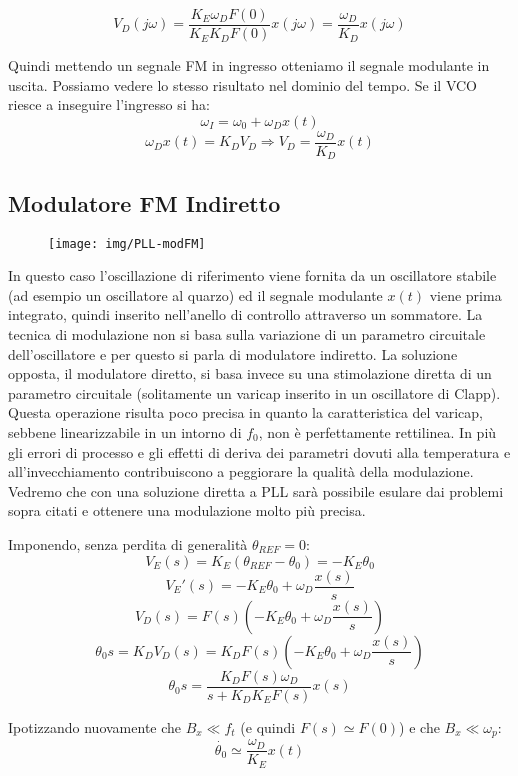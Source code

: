 \[ V_D(j\omega) = \frac{K_E \omega_D F(0)}{K_E K_D F(0)} x(j\omega) = \frac{\omega_D}{K_D} x(j\omega)\]

Quindi mettendo un segnale FM in ingresso otteniamo il segnale modulante in uscita. Possiamo vedere lo stesso risultato nel dominio del tempo. Se il VCO riesce a inseguire l'ingresso si ha:
\[\omega_I = \omega_0 + \omega_D x(t)  \]
\[\omega_D x(t) = K_D V_D \Rightarrow V_D = \frac{\omega_D}{K_D} x(t)\]

\subsection{Modulatore FM Indiretto}

\begin{figure}[hbt]
	\centering
	\texttt{[image: img/PLL-modFM]}
	\caption{}
	\label{fig:pll-modfm}
\end{figure}


In questo caso l'oscillazione di riferimento viene fornita da un oscillatore stabile (ad esempio un
oscillatore al quarzo) ed il segnale modulante $x(t)$ viene prima integrato, quindi inserito nell'anello
di controllo attraverso un sommatore. 
La tecnica di modulazione non si basa sulla variazione di un parametro circuitale dell'oscillatore e per questo si parla di modulatore indiretto. La soluzione opposta, il modulatore diretto, si basa invece su una stimolazione diretta di un parametro circuitale (solitamente un varicap inserito in un oscillatore di Clapp). Questa operazione risulta poco precisa in quanto la caratteristica del varicap, sebbene linearizzabile in un intorno di $f_0$, non è perfettamente rettilinea. In più gli errori di processo e gli effetti di deriva dei parametri dovuti alla temperatura e all'invecchiamento contribuiscono a peggiorare la qualità della modulazione. Vedremo che con una soluzione diretta a PLL sarà possibile esulare dai problemi sopra citati e ottenere una modulazione molto più precisa.

Imponendo, senza perdita di generalità $\theta_{REF} = 0$: 
\[V_E (s) = K_E(\theta_{REF} - \theta_{0}) = -K_E\theta_{0}\]
\[V_E'(s) = -K_E\theta_{0} + \omega_D \frac{x(s)}{s} \]
\[V_D (s) = F(s)\left(-K_E\theta_{0} + \omega_D \frac{x(s)}{s}\right) \]
\[\theta_{0}s = K_D V_D (s) = K_D F(s)\left(-K_E\theta_{0} + \omega_D \frac{x(s)}{s}\right) \]
\[\theta_{0}s = \frac{K_D F(s) \omega_D}{s+K_D K_E F(s)} x(s)\]

Ipotizzando nuovamente che $B_x \ll f_t$ (e quindi $F(s) \simeq F(0)$) e che $B_x \ll \omega_p$:
\[\dot{\theta_{0}} \simeq \frac{\omega_D}{K_E} x(t)\]

